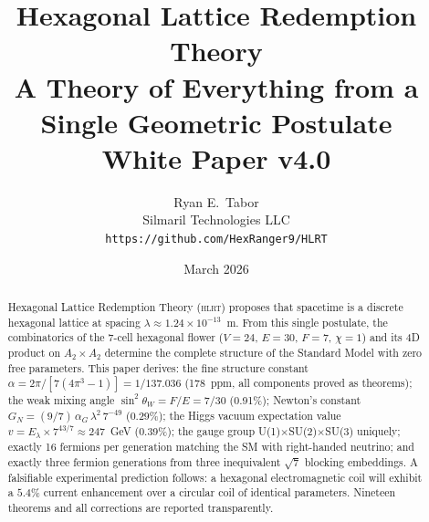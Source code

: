 \documentclass[12pt,a4paper]{article}
\title{\textbf{Hexagonal Lattice Redemption Theory} \\[0.3em]
\large A Theory of Everything from a Single Geometric Postulate \\[0.5em]
\normalsize White Paper v4.0}
\author{Ryan E.\ Tabor \\
Silmaril Technologies LLC \\
\texttt{https://github.com/HexRanger9/HLRT}}
\date{March 2026}
\theoremstyle{plain}
\theoremstyle{definition}
\newcommand{\HLRT}{\textsc{hlrt}}
\begin{document}

\maketitle

\begin{abstract}
Hexagonal Lattice Redemption Theory (\HLRT{}) proposes that spacetime is a discrete hexagonal lattice at spacing $\lambda \approx 1.24 \times 10^{-13}$~m. From this single postulate, the combinatorics of the 7-cell hexagonal flower ($V=24$, $E=30$, $F=7$, $\chi=1$) and its 4D product on $A_2 \times A_2$ determine the complete structure of the Standard Model with zero free parameters. This paper derives: the fine structure constant $\alpha = 2\pi/[7(4\pi^3 - 1)] = 1/137.036$ (178~ppm, all components proved as theorems); the weak mixing angle $\sin^2\theta_W = F/E = 7/30$ (0.91\%); Newton's constant $G_N = (9/7)\,\alpha_G\,\lambda^2\,7^{-49}$ (0.29\%); the Higgs vacuum expectation value $v = E_\lambda \times 7^{43/7} \approx 247$~GeV (0.39\%); the gauge group U(1)$\times$SU(2)$\times$SU(3) uniquely; exactly 16 fermions per generation matching the SM with right-handed neutrino; and exactly three fermion generations from three inequivalent $\sqrt{7}$ blocking embeddings. A falsifiable experimental prediction follows: a hexagonal electromagnetic coil will exhibit a $5.4\%$ current enhancement over a circular coil of identical parameters. Nineteen theorems and all corrections are reported transparently.
\end{abstract}

\end{document}
